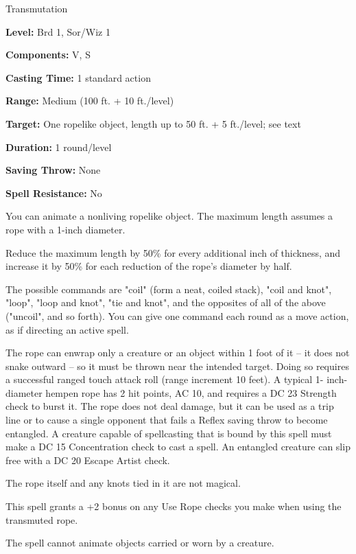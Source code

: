 
Transmutation

\textbf{Level:} Brd 1, Sor/Wiz 1

\textbf{Components:} V, S

\textbf{Casting Time:} 1 standard action

\textbf{Range:} Medium (100 ft. + 10 ft./level)

\textbf{Target:} One ropelike object, length up to 50 ft. + 5 ft./level; see text

\textbf{Duration:} 1 round/level

\textbf{Saving Throw:} None

\textbf{Spell Resistance:} No

You can animate a nonliving ropelike object. The maximum length assumes a rope 
with a 1-inch diameter.

Reduce the maximum length by 50\% for every additional inch of thickness, and increase 
it by 50\% for each reduction of the rope's diameter by half.

The possible commands are "coil" (form a neat, coiled stack), "coil and knot", 
"loop", "loop and knot", "tie and knot", and the opposites of all of the 
above ("uncoil", and so forth). You can give one command each round as a move 
action, as if directing an active spell.

The rope can enwrap only a creature or an object within 1 foot of it -- it does 
not snake outward -- so it must be thrown near the intended target. Doing so requires 
a successful ranged touch attack roll (range increment 10 feet). A typical 1- inch-diameter 
hempen rope has 2 hit points, AC 10, and requires a DC 23 Strength check to burst 
it. The rope does not deal damage, but it can be used as a trip line or to cause 
a single opponent that fails a Reflex saving throw to become entangled. A creature 
capable of spellcasting that is bound by this spell must make a DC 15 Concentration 
check to cast a spell. An entangled creature can slip free with a DC 20 Escape 
Artist check.

The rope itself and any knots tied in it are not magical.

This spell grants a +2 bonus on any Use Rope checks you make when using the transmuted 
rope.

The spell cannot animate objects carried or worn by a creature.

